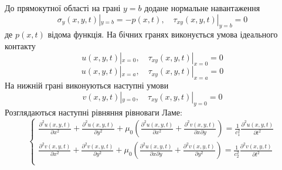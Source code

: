 До прямокутної області на грані $y=b$ додане нормальне навантаження
\begin{equation}
    \sigma_y(x, y, t) |_{y=b} = -p(x, t), \quad  \tau_{xy}(x,y,t) |_{y=b} =0
\end{equation}
де $p(x,t)$ відома функція.
На бічних гранях виконується умова ідеального контакту
\begin{equation}
    u(x,y,t) |_{x=0}, \quad \tau_{xy}(x,y,t) |_{x=0} =0
\end{equation}
\begin{equation}
    u(x,y,t) |_{x=a}, \quad \tau_{xy}(x,y,t) |_{x=a} =0
\end{equation}
На нижній грані виконуються наступні умови
\begin{equation}
    v(x,y,t) |_{y=0}, \quad \tau_{xy}(x,y,t) |_{y=0} =0
\end{equation}
Розглядаються наступні рівняння рівноваги Ламе:
\begin{equation}
    \begin{cases}
        \frac{\partial^2 u(x,y,t)}{\partial x^2} + \frac{\partial^2 u(x,y,t)}{\partial y^2} + \mu_0 (\frac{\partial^2 u(x,y,t)}{\partial x^2} + \frac{\partial^2 v(x,y,t)}{\partial x\partial y}) = \frac{1}{c_1^2} \frac{\partial^2 u(x,y,t)}{\partial t^2} \\
        \frac{\partial^2 v(x,y,t)}{\partial x^2} + \frac{\partial^2 v(x,y,t)}{\partial y^2} + \mu_0 (\frac{\partial^2 u(x,y,t)}{\partial x \partial y} + \frac{\partial^2 v(x,y,t)}{\partial y^2}) = \frac{1}{c_2^2} \frac{\partial^2 v(x,y,t)}{\partial t^2} \\
    \end{cases}
\end{equation}


